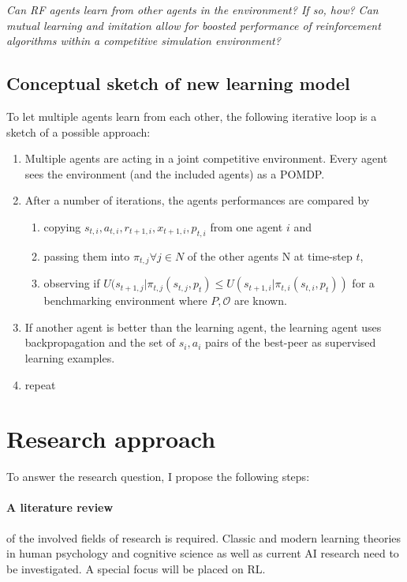 \documentclass[12pt,a4paper]{article}
\begin{document}
\emph{Can RF agents learn from other agents in the environment? If so, how? Can mutual learning and imitation allow for boosted performance of reinforcement algorithms within a competitive simulation environment?}

\subsection{Conceptual sketch of new learning model}

To let multiple agents learn from each other, the following iterative loop is a sketch of a possible approach:



\begin{enumerate}
    \item Multiple agents are acting in a joint competitive environment. Every agent sees the environment (and the included agents) as a \ac{POMDP}.
    \item After a number of iterations, the agents performances are compared by

\begin{enumerate}
    \item copying
    $s_{t,i},a_{t,i},r_{t+1,i},x_{t+1,i},p_{t,i}$ from one agent $i$ and
    \item passing them into $\pi_{t,j} \forall j \in N $ of the other agents N at time-step $t$,
    \item  observing if $ U(s_{t+1,j} \vert \pi_{t,j}(s_{t,j}, p_t) \leq U(s_{t+1,i} \vert \pi_{t,i}(s_{t,i},p_t))$ for a benchmarking environment where $P, \mathcal{O}$ are known.
\end{enumerate}
    \item  If another agent is better than the learning agent, the learning agent uses backpropagation and the set of $s_i,a_i$ pairs of the best-peer as supervised learning examples.
    \item repeat
\end{enumerate}

\section{Research approach}


To answer the research question, I propose the following steps:

\paragraph{A literature review} of the involved fields of research is required. Classic and modern learning theories in human psychology and cognitive science as well as current AI research need to be investigated. A special focus will be placed on \ac{RL}.
\end{document}
